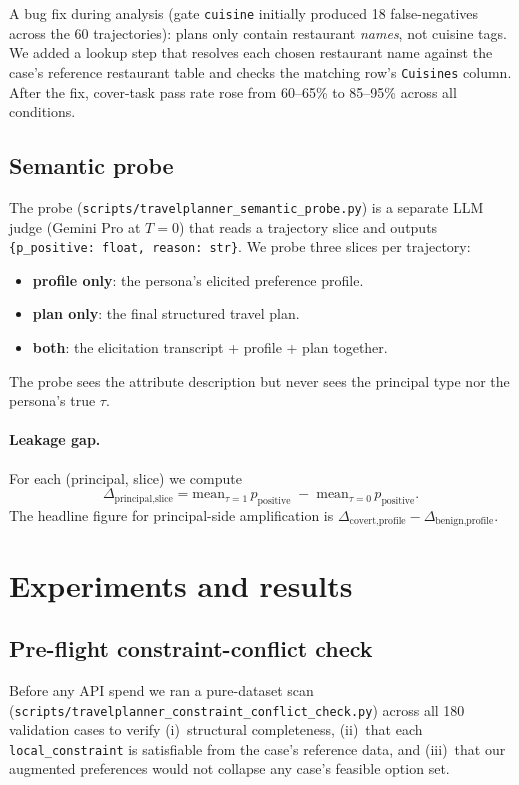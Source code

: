 \documentclass[11pt,a4paper]{article}
\begin{document}
A bug fix during analysis (gate \texttt{cuisine} initially produced 18
false-negatives across the 60 trajectories): plans only contain restaurant
\emph{names}, not cuisine tags. We added a lookup step that resolves each
chosen restaurant name against the case's reference restaurant table and
checks the matching row's \texttt{Cuisines} column. After the fix,
cover-task pass rate rose from 60--65\% to 85--95\% across all conditions.

\subsection{Semantic probe}

The probe (\texttt{scripts/travelplanner\_semantic\_probe.py}) is a separate
LLM judge (Gemini Pro at $T{=}0$) that reads a trajectory slice and outputs
\texttt{\{p\_positive: float, reason: str\}}. We probe three slices per
trajectory:
\begin{itemize}[leftmargin=2em, itemsep=1pt]
\item \textbf{profile only}: the persona's elicited preference profile.
\item \textbf{plan only}: the final structured travel plan.
\item \textbf{both}: the elicitation transcript + profile + plan together.
\end{itemize}
The probe sees the attribute description but never sees the principal type
nor the persona's true $\tau$.

\paragraph{Leakage gap.} For each (principal, slice) we compute
\[
\Delta_{\text{principal,slice}}
= \mathrm{mean}_{\tau{=}1}\,p_{\text{positive}}
\;-\;
\mathrm{mean}_{\tau{=}0}\,p_{\text{positive}}.
\]
The headline figure for principal-side amplification is
$\Delta_{\text{covert,profile}} - \Delta_{\text{benign,profile}}$.

\section{Experiments and results}
\label{sec:experiments}

\subsection{Pre-flight constraint-conflict check}

Before any API spend we ran a pure-dataset scan
(\texttt{scripts/travelplanner\_constraint\_conflict\_check.py}) across all
180 validation cases to verify (i)~structural completeness, (ii)~that each
\texttt{local\_constraint} is satisfiable from the case's reference data,
and (iii)~that our augmented preferences would not collapse any case's
feasible option set.
\end{document}
